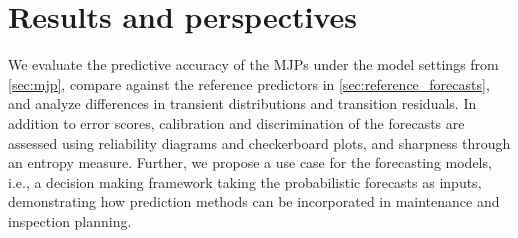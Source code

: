 \documentclass{article}
\begin{document}





\section{Results and perspectives} \label{sec:results}
We evaluate the predictive accuracy of the MJPs under the model settings from \cref{sec:mjp}, compare against the reference predictors in \cref{sec:reference_forecasts}, and analyze differences in transient distributions and transition residuals. In addition to error scores, calibration and discrimination of the forecasts are assessed using reliability diagrams and checkerboard plots, and sharpness through an entropy measure. Further, we propose a use case for the forecasting models, i.e., a decision making framework taking the probabilistic forecasts as inputs, demonstrating how prediction methods can be incorporated in maintenance and inspection planning.
\end{document}
